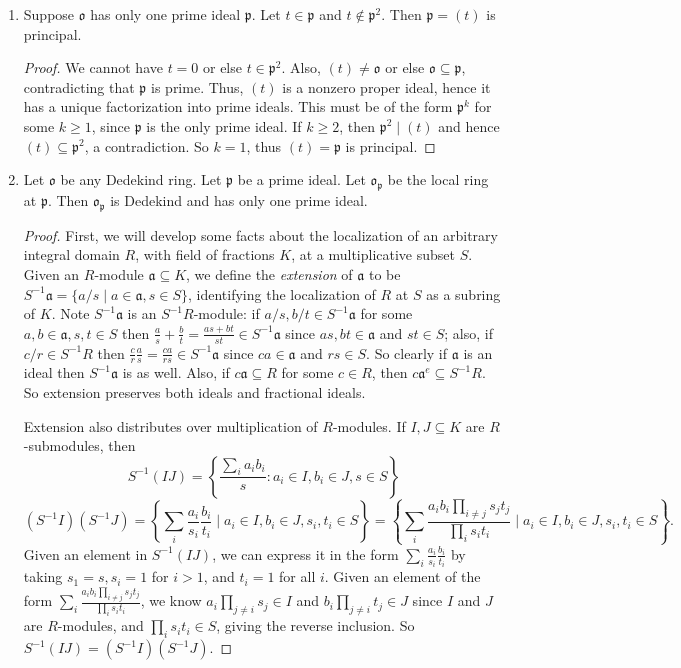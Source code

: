 \documentclass[10pt]{article}
\newcommand{\p}{\mathfrak{p}}
\renewcommand{\a}{\mathfrak{a}}
\renewcommand{\o}{\mathfrak{o}}
\begin{document}
\begin{enumerate}
\item Suppose $\o$ has only one prime ideal $\p$.  Let $t \in \p$ and $t \not \in \p^2$.  Then $\p = (t)$ is principal.

\begin{proof}

We cannot have $t = 0$ or else $t \in \p^2$.  Also, $(t) \neq \o$ or else $\o \subseteq \p$, contradicting that $\p$ is prime.  Thus, $(t)$ is a nonzero proper ideal, hence it has a unique factorization into prime ideals.  This must be of the form $\p^k$ for some $k \geq 1$, since $\p$ is the only prime ideal.  If $k \geq 2$, then $\p^2 \mid (t)$ and hence $(t) \subseteq \p^2$, a contradiction.  So $k = 1$, thus $(t) = \p$ is principal.

\end{proof}

\item Let $\o$ be any Dedekind ring.  Let $\p$ be a prime ideal.  Let $\o_\p$ be the local ring at $\p$.  Then $\o_\p$ is Dedekind and has only one prime ideal.

\begin{proof}

First, we will develop some facts about the localization of an arbitrary integral domain $R$, with field of fractions $K$, at a multiplicative subset $S$.  Given an $R$-module $\a \subseteq K$, we define the \emph{extension} of $\a$ to be $S^{-1}\a = \{a/s \mid a \in \a, s \in S\}$, identifying the localization of $R$ at $S$ as a subring of $K$.  Note $S^{-1}\a$ is an $S^{-1}R$-module: if $a/s,b/t \in S^{-1}\a$ for some $a,b \in \a, s,t \in S$ then $\frac{a}{s} + \frac{b}{t} = \frac{as + bt}{st} \in S^{-1}\a$ since $as, bt \in \a$ and $st \in S$; also, if $c/r \in S^{-1}R$ then $\frac{c}{r}\frac{a}{s} = \frac{ca}{rs} \in S^{-1}\a$ since $ca \in \a$ and $rs \in S$.  So clearly if $\a$ is an ideal then $S^{-1}\a$ is as well.  Also, if $c\a \subseteq R$ for some $c \in R$, then $c\a^e \subseteq S^{-1}R$.  So extension preserves both ideals and fractional ideals.

Extension also distributes over multiplication of $R$-modules.  If $I,J \subseteq K$ are $R$-submodules, then
$$
S^{-1}(IJ) = \left\{\frac{\sum_i a_ib_i}{s} : a_i \in I, b_i \in J, s \in S \right\}
$$
$$
(S^{-1}I)(S^{-1}J) = \left\{ \sum_i \frac{a_i}{s_i}\frac{b_i}{t_i} \mid a_i \in I, b_i \in J, s_i,t_i \in S \right\} = \left\{ \sum_i \frac{a_ib_i \prod\limits_{i \neq j} s_j t_j}{\prod\limits_{i} s_i t_i} \mid a_i \in I, b_i \in J, s_i,t_i \in S \right\}.
$$
Given an element in $S^{-1}(IJ)$, we can express it in the form $\sum\limits_i \frac{a_i}{s_i}\frac{b_i}{t_i}$ by taking $s_1 = s, s_i = 1$ for $i > 1$, and $t_i = 1$ for all $i$.  Given an element of the form $\sum\limits_i \frac{a_ib_i \prod\limits_{i \neq j} s_j t_j}{\prod\limits_{i} s_i t_i}$, we know $a_i \prod\limits_{j \neq i} s_j \in I$ and $b_i \prod\limits_{j \neq i} t_j \in J$ since $I$ and $J$ are $R$-modules, and $\prod\limits_{i} s_it_i \in S$, giving the reverse inclusion.  So $S^{-1}(IJ) = (S^{-1}I)(S^{-1}J)$.


\end{proof}
\end{enumerate}
\end{document}

